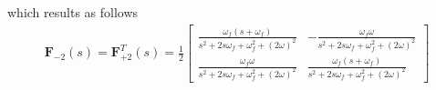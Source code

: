 \documentclass[11pt,a4paper,oneside]{book}
\numberwithin{equation}{section}
\theoremstyle{it}
\theoremstyle{definition}
\begin{document}
\begin{onehalfspace}
\begin{equation}
\end{equation}
which results as follows
\begin{equation} \label{pll_eq_41}
	\begin{aligned}
		\mathbf{F}_{-2}(s) = \mathbf{F}_{+2}^T(s) = \frac{1}{2}\begin{bmatrix} \frac{\omega_{f}(s+\omega_{f})}{s^2+2s\omega_{f}+\omega_{f}^2+(2\omega)^2} & -\frac{\omega_{f}\omega}{s^2+2s\omega_{f}+\omega_{f}^2+(2\omega)^2} \\[8pt] \frac{\omega_{f}\omega}{s^2+2s\omega_{f}+\omega_{f}^2+(2\omega)^2} & \frac{\omega_{f}(s+\omega_{f})}{s^2+2s\omega_{f}+\omega_{f}^2+(2\omega)^2}
		\end{bmatrix}
	\end{aligned}
\end{equation}



\end{onehalfspace}
\end{document}
